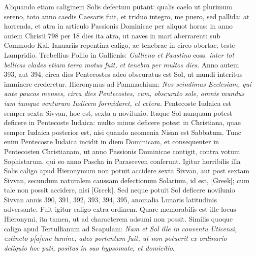 Aliquando etiam caliginem Solis defectum putant:
 qualis caelo ut plurimum
sereno, toto anno caedis Caesaris fuit, et triduo integro, me puero,
sed pallida: at horrenda, et atra in articulo Passionis Dominicae
per aliquot horas: in anno autem Christi 798 per 18 dies ita atra, ut
naves in mari aberrarent: sub Commodo Kal. Ianuariis repentina caligo,
ac tenebrae in circo obortae, teste Lampridio.
Trebellius Pollio in
Gallienis: \textit{Gallieno et Faustino}
 coss. \textit{inter tot bellicas clades etiam terra
motus fuit, et tenebra per multos dies.}
Anno autem 393, aut 394, circa
dies Pentecostes adeo obscuratus est Sol, ut mundi interitus imminere
crederetur.
Hieronymus ad Pammachium: \textit{Nos scindimus Ecclesiam,
qui ante paucos menses, circa dies Pentecostes, cum, obscurato
sole, omnis mundus iam iamque venturum Iudicem formidaret, et cetera.}
Pentecoste Iudaica est semper sexta Sivvan, hoc est, sexta a novilunio.
Itaque Sol nunquam potest deficere in Pentecoste Iudaica: multo minus
deficere potest in Christiana, quae semper Iudaica posterior est, nisi
quando neomenia Nisan est Sabbatum.
Tunc enim Pentecoste Iudaica
incidit in diem Dominicam, et consequenter in Pentecosten Christianam,
ut anno Passionis Dominicae contigit, contra votum Sophistarum,
qui eo anno Pascha in Parasceven conferunt.
Igitur horribilis
illa Solis caligo apud Hieronymum non potuit accidere sexta Sivvan,
aut post sextam Sivvan, secundum naturalem caussam defectionum
Solarium, id est, \textgreek{[Greek]}; cum tale non possit
accidere, nisi \textgreek{[Greek]}.
Sed neque potuit Sol deficere novilunio
Sivvan annis 390, 391, 392, 393, 394, 395, anomalia Lunaris latitudinis
adversante.
Fuit igitur caligo extra ordinem.
Quare memorabilis
est ille locus Hieronymi, ita tamen, ut ad characterem adsumi non
possit.
Similis quoque caligo apud Tertullianum ad Scapulam: \textit{Nam et
Sol ille in conventu Uticensi, extincto p[a]ene lumine, adeo portentum fuit, ut
non potuerit ex ordinario deliquio hoc pati, positus in suo hypsomate, et
domicilio}.

